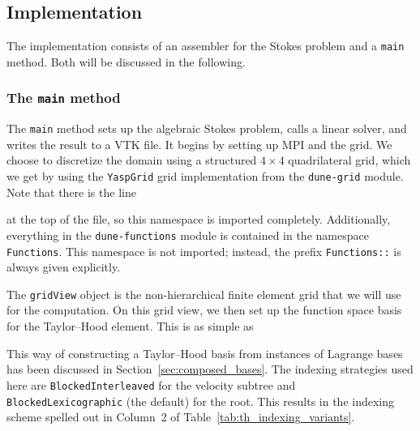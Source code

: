 \documentclass[a4paper,10pt,headings=normal,bibliography=totoc]{scrartcl}
\newcommand{\cpp}[1]{\lstinline[basicstyle=\ttfamily]!#1!}
\newcommand{\dunemodule}[1]{\texttt{#1}}
\begin{document}
\subsection{Implementation}

The implementation consists of an assembler for the Stokes problem and a \cpp{main}
method. Both will be discussed in the following.

\subsubsection{The \texorpdfstring{\cpp{main}}{main} method}
\label{sec:stokes_example_main}

The \cpp{main} method sets up the algebraic Stokes problem, calls a linear solver,
and writes the result to a VTK file. It begins by setting up MPI and the grid.
We choose to discretize the domain using a structured $4 \times 4$ quadrilateral
grid, which we get by using the \cpp{YaspGrid} grid implementation from the
\dunemodule{dune-grid} module.  Note that there is the line
%

%
at the top of the file, so this namespace is imported completely.  Additionally, everything in the \dunemodule{dune-functions}
module is contained in the namespace \cpp{Functions}.  This namespace is not imported; instead, the prefix \cpp{Functions::} is always
given explicitly.


%

%
%

%
The \cpp{gridView} object is the non-hierarchical finite element grid that we will use for
the computation.
On this grid view, we then set up the function space basis for the Taylor--Hood element.  This is as simple as
%

%
This way of constructing a Taylor--Hood basis from instances of Lagrange bases
has been discussed in Section~\ref{sec:composed_bases}.  The indexing strategies
used here are \cpp{BlockedInterleaved} for the velocity subtree and \cpp{BlockedLexicographic}
(the default) for the root.  This results in the indexing scheme spelled out in
Column~2 of Table~\ref{tab:th_indexing_variants}.
\end{document}
